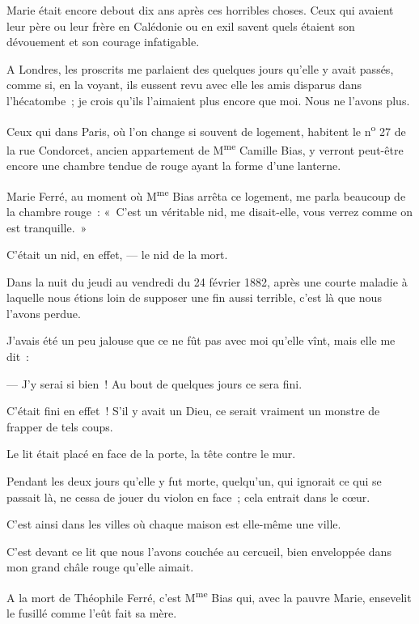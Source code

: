 \documentclass[french,twoside]{book} %
\newcommand{\astertri}{\medskip\par\centerline{\color{rubric}\large\selectfont{\syms ✻\,✻\,✻}}\medskip\par}%
\begin{document}
\noindent Marie était encore debout dix ans après ces horribles choses. Ceux qui avaient leur père ou leur frère en Calédonie ou en exil savent quels étaient son dévouement et son courage infatigable.\par
A Londres, les proscrits me parlaient des quelques jours qu’elle y avait passés, comme si, en la voyant, ils eussent revu avec elle les amis disparus dans l’hécatombe ; je crois qu’ils l’aimaient plus encore que moi. Nous ne l’avons plus.\par
Ceux qui dans Paris, où l’on change si souvent de logement, habitent le n\textsuperscript{o} 27 de la rue Condorcet, ancien appartement de M\textsuperscript{me} Camille Bias, y verront peut-être encore une chambre tendue de rouge ayant la forme d’une lanterne.\par
Marie Ferré, au moment où M\textsuperscript{me} Bias arrêta ce logement, me parla beaucoup de la chambre rouge : « C’est un véritable nid, me disait-elle, vous verrez comme on est tranquille. »\par
C’était un nid, en effet, — le nid de la mort.\par
Dans la nuit du jeudi au vendredi du 24 février 1882, après une courte maladie à laquelle nous étions loin de supposer une fin aussi terrible, c’est là que nous l’avons perdue.\par
 J’avais été un peu jalouse que ce ne fût pas avec moi qu’elle vînt, mais elle me dit :\par
— J’y serai si bien ! Au bout de quelques jours ce sera fini.\par
C’était fini en effet ! S’il y avait un Dieu, ce serait vraiment un monstre de frapper de tels coups.\par
Le lit était placé en face de la porte, la tête contre le mur.\par
Pendant les deux jours qu’elle y fut morte, quelqu’un, qui ignorait ce qui se passait là, ne cessa de jouer du violon en face ; cela entrait dans le cœur.\par
C’est ainsi dans les villes où chaque maison est elle-même une ville.\par
C’est devant ce lit que nous l’avons couchée au cercueil, bien enveloppée dans mon grand châle rouge qu’elle aimait.\par
A la mort de Théophile Ferré, c’est M\textsuperscript{me} Bias qui, avec la pauvre Marie, ensevelit le fusillé comme l’eût fait sa mère.\par
\bigbreak

\astertri
\end{document}
